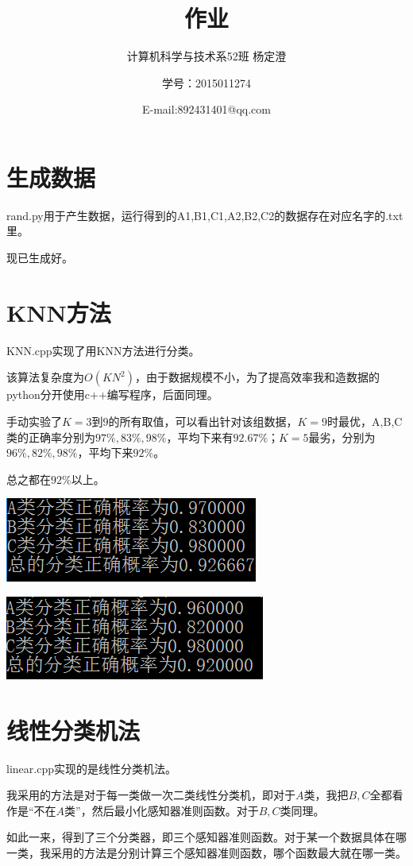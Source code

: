 \documentclass{ctexart}
\begin{document}
\title{作业}
\author{计算机科学与技术系52班 杨定澄 \and 学号：2015011274 \and E-mail:892431401@qq.com}
\date{}
\maketitle
\section{生成数据}
rand.py用于产生数据，运行得到的A1,B1,C1,A2,B2,C2的数据存在对应名字的.txt里。

现已生成好。
\section{KNN方法}
KNN.cpp实现了用KNN方法进行分类。

该算法复杂度为$O(KN^2)$，由于数据规模不小，为了提高效率我和造数据的python分开使用c++编写程序，后面同理。

手动实验了$K=3$到$9$的所有取值，可以看出针对该组数据，$K=9$时最优，A,B,C类的正确率分别为$97\%,83\%,98\%$，平均下来有$92.67\%$；$K=5$最劣，分别为$96\%,82\%,98\%$，平均下来$92\%$。

总之都在$92\%$以上。

\includegraphics{1.png}

\includegraphics{2.png}


\section{线性分类机法}
linear.cpp实现的是线性分类机法。

我采用的方法是对于每一类做一次二类线性分类机，即对于$A$类，我把$B,C$全都看作是“不在$A$类”，然后最小化感知器准则函数。对于$B,C$类同理。

如此一来，得到了三个分类器，即三个感知器准则函数。对于某一个数据具体在哪一类，我采用的方法是分别计算三个感知器准则函数，哪个函数最大就在哪一类。
\end{document}
